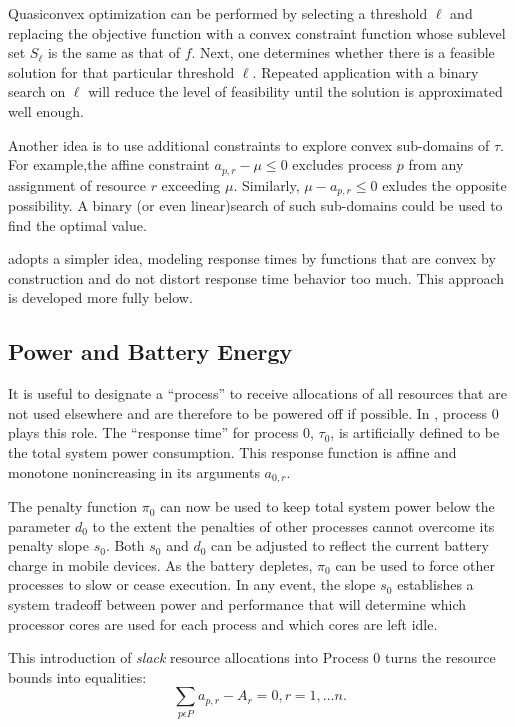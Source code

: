 Quasiconvex optimization can be performed by selecting a threshold $\ell$ and replacing the objective function
with a convex constraint function whose sublevel set $S_\ell$ is the same as that of $f$.
Next, one determines whether there is a feasible solution for that particular threshold $\ell$.
Repeated application with a binary search on $\ell$ will reduce the level of feasibility
until the solution is approximated well enough.

Another idea is to use additional constraints to explore convex sub-domains of $\tau$.
For example,the affine constraint $a_{p,r} - \mu \leq 0$ excludes process $p$ from any assignment of resource $r$ exceeding $\mu$.  Similarly, $\mu - a_{p,r} \leq 0$ exludes the opposite possibility.
A binary (or even linear)search of such sub-domains could be used to find the optimal value.

\pacora adopts a simpler idea, modeling response times by functions that are convex by construction
and do not distort response time behavior too much.  This approach is developed more fully below.


\subsection*{Power and Battery Energy}

It is useful to designate a ``process'' to receive allocations of all resources
that are not used elsewhere and are therefore to be powered off if possible.
In \pacora, process 0 plays this role.
The ``response time'' for process 0, $\tau_0$,
is artificially defined to be the total system power consumption.
This response function is affine and monotone nonincreasing in its arguments $a_{0,r}$.

The penalty function $\pi_0$ can now be used to keep total system power below the parameter $d_0$
to the extent the penalties of other processes cannot overcome its penalty slope $s_0$.
Both $s_0$ and $d_0$ can be adjusted to reflect the current battery charge in mobile devices.
As the battery depletes, $\pi_0$ can be used to force other processes to slow or cease execution.
In any event, the slope $s_0$ establishes a system tradeoff between power and performance that
will determine which processor cores are used for each process and which cores are left idle.

This introduction of \emph{slack} resource allocations into Process 0 turns the resource bounds into equalities:
\begin{displaymath}
\sum_{p\epsilon P} a_{p,r} - A_r = 0, r = 1,\dots n.
\end{displaymath}


